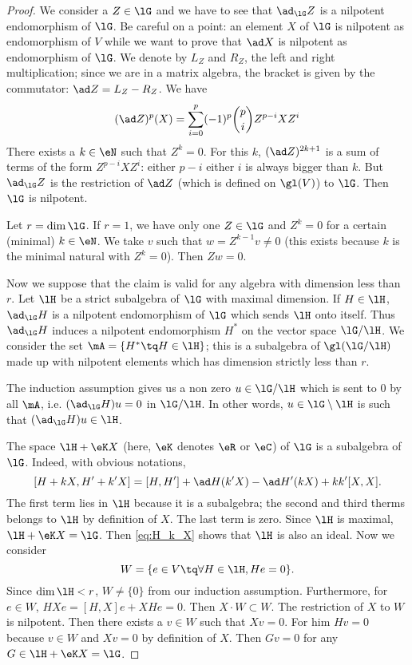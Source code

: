 \begin{proof}
	 We consider a $Z\in\lG$ and we have to see that $\ad_{\lG}Z$ is a nilpotent endomorphism of $\lG$. Be careful on a point: an element $X$ of $\lG$ is nilpotent as endomorphism of $V$ while we want to prove that $\ad X$ is nilpotent as endomorphism of $\lG$. We denote by $L_Z$ and $R_Z$, the left and right multiplication; since we are in a matrix algebra, the bracket is given by the commutator: $\ad Z=L_Z-R_Z$. We have
	\begin{equation}
		(\ad Z)^p(X)=\sum_{i=0}^p(-1)^p \binom{p}{i}  Z^{p-i}XZ^i
	\end{equation}
	There exists a $k\in\eN$ such that $Z^k=0$. For this $k$, $(\ad Z)^{2k+1}$ is a sum of terms of the form $Z^{p-i}XZ^i$: either $p-i$ either $i$ is always bigger than $k$. But $\ad_{\lG}Z$ is the restriction of $\ad Z$ (which is defined on $\gl(V)$) to $\lG$. Then $\lG$ is nilpotent.

	 Let $r=\dim\lG$. If $r=1$, we have only one $Z\in\lG$ and $Z^k=0$ for a certain (minimal) $k\in\eN$. We take $v$ such that $w=Z^{k-1}v\neq 0$ (this exists because $k$ is the minimal natural with $Z^k=0$). Then $Zw=0$.

	Now we suppose that the claim is valid for any algebra with dimension less than $r$. Let $\lH$ be a strict subalgebra of $\lG$ with maximal dimension. If $H\in\lH$, $\ad_{\lG}H$ is a nilpotent endomorphism of $\lG$ which sends $\lH$ onto itself. Thus $\ad_{\lG}H$ induces a nilpotent endomorphism $H^*$ on the vector space $\lG/\lH$. We consider the set $\mA=\{H^*\tq H\in\lH\}$; this is a subalgebra of $\gl(\lG/\lH)$ made up with nilpotent elements which has dimension strictly less than $r$.

	The induction assumption gives us a non zero $u\in \lG/\lH$ which is sent to $0$ by all $\mA$, i.e. $(\ad_{\lG}H)u=0$ in $\lG/\lH$. In other words, $u\in\lG\setminus\lH$ is such that $(\ad_{\lG}H)u\in\lH$.

	The space $\lH+\eK X$ (here, $\eK$ denotes $\eR$ or $\eC$) of $\lG$ is a subalgebra of $\lG$. Indeed, with obvious notations,
	\begin{equation}\label{eq:H_k_X}
		[H+kX,H'+k'X]=[H,H']+\ad H(k'X)-\ad H'(kX)+kk'[X,X].
	\end{equation}
	The first term lies in $\lH$ because it is a subalgebra; the second and third therms belongs to $\lH$ by definition of $X$. The last term is zero. Since $\lH$ is maximal, $\lH+\eK X=\lG$. Then \eqref{eq:H_k_X} shows that $\lH$ is also an ideal. Now we consider
	\[
		W=\{e\in V\tq\forall H\in\lH, He=0\}.
	\]
	Since $\dim\lH< r$, $W\neq\{0\}$ from our induction assumption. Furthermore, for $e\in W$, $HXe=[H,X]e+XHe=0$. Then $X\cdot W\subset W$. The restriction of $X$ to $W$ is nilpotent. Then there exists a $v\in W$ such that $Xv=0$. For him $Hv=0$ because $v\in W$ and $Xv=0$ by definition of $X$. Then $Gv=0$ for any $G\in\lH+\eK X=\lG$.


\end{proof}
